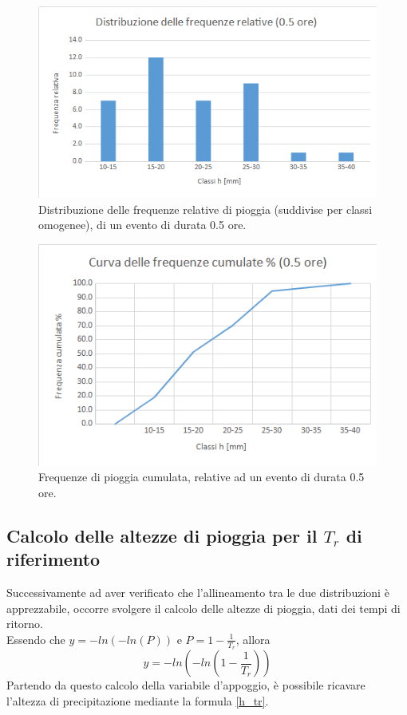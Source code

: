 \begin{figure}[H]\centering
    \includegraphics[scale=.6]{immagini/freq_piogg_rel_05ore.png}
    \caption{Distribuzione delle frequenze relative di pioggia (suddivise per classi omogenee), di un evento di durata 0.5 ore.}
  \label{freq_rel_piogg_05ore}
\end{figure}

\begin{figure}[H]\centering
    \includegraphics[scale=.6]{immagini/freq_piogg_cum_05ore.png}
    \caption{Frequenze di pioggia cumulata, relative ad un evento di durata 0.5 ore.}
  \label{freq_cum_piogg_05ore}
\end{figure}

\subsection{Calcolo delle altezze di pioggia per il $T_r$ di riferimento}
Successivamente ad aver verificato che l'allineamento tra le due distribuzioni è apprezzabile, occorre svolgere il calcolo delle altezze di pioggia, dati dei tempi di ritorno.\\
Essendo che $y = -ln(-ln(P))$ e $P = 1-\frac{1}{T_r}$, allora 
\begin{equation}
y = -ln\left(-ln\left(1-\frac{1}{T_r}\right)\right)
\end{equation}
Partendo da questo calcolo della variabile d'appoggio, è possibile ricavare l'altezza di precipitazione mediante la formula \ref{h_tr}.

